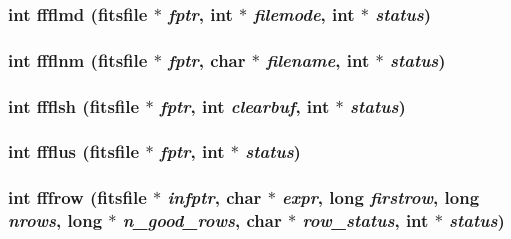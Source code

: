 \subsubsection{\setlength{\rightskip}{0pt plus 5cm}int ffflmd (\bf{fitsfile} $\ast$ {\em fptr}, int $\ast$ {\em filemode}, int $\ast$ {\em status})}\label{fitsio__64_8h_b40add552ca38d7ad3adcaa46ed38eb4}


\subsubsection{\setlength{\rightskip}{0pt plus 5cm}int ffflnm (\bf{fitsfile} $\ast$ {\em fptr}, char $\ast$ {\em filename}, int $\ast$ {\em status})}\label{fitsio__64_8h_24ea04fea8050162c7c98d944d4f4a5d}


\subsubsection{\setlength{\rightskip}{0pt plus 5cm}int ffflsh (\bf{fitsfile} $\ast$ {\em fptr}, int {\em clearbuf}, int $\ast$ {\em status})}\label{fitsio__64_8h_be4e54a1daa5329c828b6ad9b3bb9a76}


\subsubsection{\setlength{\rightskip}{0pt plus 5cm}int ffflus (\bf{fitsfile} $\ast$ {\em fptr}, int $\ast$ {\em status})}\label{fitsio__64_8h_dfee4024f70912aaaf7a9cae405114da}


\subsubsection{\setlength{\rightskip}{0pt plus 5cm}int fffrow (\bf{fitsfile} $\ast$ {\em infptr}, char $\ast$ {\em expr}, long {\em firstrow}, long {\em nrows}, long $\ast$ {\em n\_\-good\_\-rows}, char $\ast$ {\em row\_\-status}, int $\ast$ {\em status})}\label{fitsio__64_8h_1fc72ca968d2f0b3c5ccbe7bc1f96ff2}


